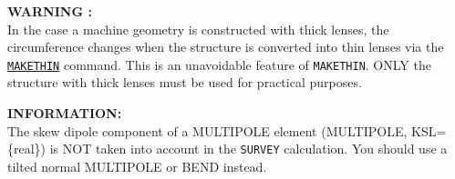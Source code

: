 {\bf WARNING :}\\
In the case a machine geometry is constructed with thick lenses, the
circumference changes when the structure is converted into thin lenses
via the \hyperref[chap:makethin]{\tt MAKETHIN} command. This is an
unavoidable feature of {\tt MAKETHIN}. ONLY the structure with thick
lenses must be used for practical purposes.


{\bf INFORMATION:}\\
The skew dipole component of a MULTIPOLE element
(MULTIPOLE, KSL=\{real\}) is NOT taken into account in the \texttt{SURVEY}
calculation. You should use a tilted normal MULTIPOLE or BEND instead.



